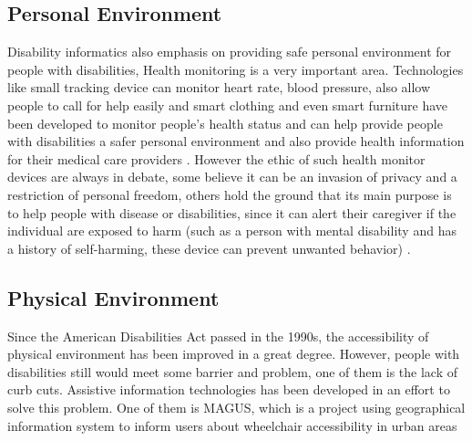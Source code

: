 \subsection{Personal Environment}
 Disability informatics also emphasis on providing safe personal environment for people with disabilities,
 Health monitoring is a very important area. Technologies like small tracking device can monitor heart rate,
 blood pressure, also allow people to call for help easily and smart clothing and even smart furniture have
 been developed to monitor people's health status and can help provide people with disabilities a safer
 personal environment and also provide health information for their medical care providers
 \cite{Appleyard2005}. However the ethic of such health monitor devices are always in debate, some believe
 it can be an invasion of privacy and a restriction of personal freedom, others hold the ground that its
 main purpose is to help people with disease or disabilities, since it can alert their caregiver if the
 individual are exposed to harm (such as a person with mental disability and has a history of self-harming,
 these device can prevent unwanted behavior) \cite{cunningham2017cloud}. 
 

\subsection{Physical Environment}
Since the American Disabilities Act passed in the 1990s, the accessibility of physical environment has been
improved in a great degree. However, people with disabilities still would meet some barrier and problem, 
one of them is the lack of curb cuts. Assistive information technologies has been developed in an effort to
solve this problem. One of them is MAGUS, which is a project using geographical information system to inform 
users about wheelchair accessibility in urban areas \cite{Appleyard2005}


